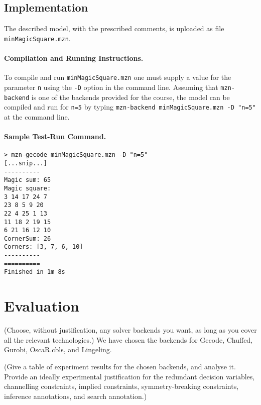 \documentclass[a4paper,11pt]{article}
\begin{document}
\subsection{Implementation}
\label{sec:minMagicSquare:impl}

The described model, with the prescribed comments, is uploaded as file
\texttt{minMagicSquare.mzn}.

\paragraph{Compilation and Running Instructions.}
To compile and run \texttt{minMagicSquare.mzn} one must supply a value
for the parameter \texttt{n} using the \texttt{-D} option in the
command line.
%
Assuming that \texttt{mzn-backend} is one of the backends provided for
the course, the model can be compiled and run for \texttt{n=5} by
typing \texttt{mzn-backend minMagicSquare.mzn -D "n=5"} at the command
line.

\paragraph{Sample Test-Run Command.}
\begin{verbatim}
> mzn-gecode minMagicSquare.mzn -D "n=5"
[...snip...]
----------
Magic sum: 65
Magic square: 
3 14 17 24 7
23 8 5 9 20
22 4 25 1 13
11 18 2 19 15
6 21 16 12 10
CornerSum: 26
Corners: [3, 7, 6, 10]
----------
==========
Finished in 1m 8s
\end{verbatim}

\section{Evaluation}
\label{sec:minMagicSquare:eval}

\newcommand{\TimeOut}{600}  %

(Choose, without justification, any solver backends you want, as long as you
cover all the relevant technologies.)
%
We have chosen the backends for Gecode, Chuffed, Gurobi, OscaR.cbls,
and Lingeling.

(Give a table of experiment results for the chosen backends, and
analyse it.  Provide an ideally experimental justification for the
redundant decision variables, channelling constraints, implied
constraints, symmetry-breaking constraints, inference annotations, and
search annotation.)
\end{document}
